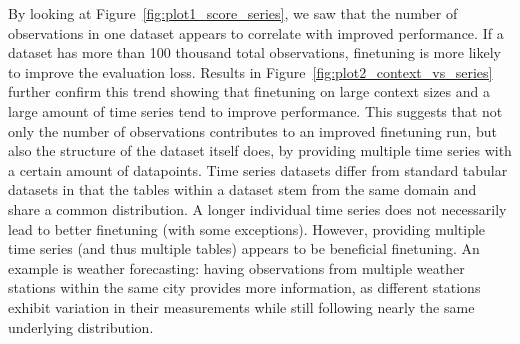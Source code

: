By looking at Figure~\ref{fig:plot1_score_series}, we saw that the number of observations in one dataset appears to correlate with improved performance.
If a dataset has more than 100 thousand total observations, finetuning is more likely to improve the evaluation loss.
Results in Figure~\ref{fig:plot2_context_vs_series} further confirm this trend showing that finetuning on large context sizes and a large amount of time series tend to improve performance.
This suggests that not only the number of observations contributes to an improved finetuning run, but also the structure of the dataset itself does, by providing multiple time series with a certain amount of datapoints.
\newline
Time series datasets differ from standard tabular datasets in that the tables within a dataset stem from the same domain and share a common distribution.
A longer individual time series does not necessarily lead to better finetuning (with some exceptions).
However, providing multiple time series (and thus multiple tables) appears to be beneficial finetuning.
An example is weather forecasting: having observations from multiple weather stations within the same city provides more information, as different stations exhibit variation in their measurements while still following nearly the same underlying distribution.

